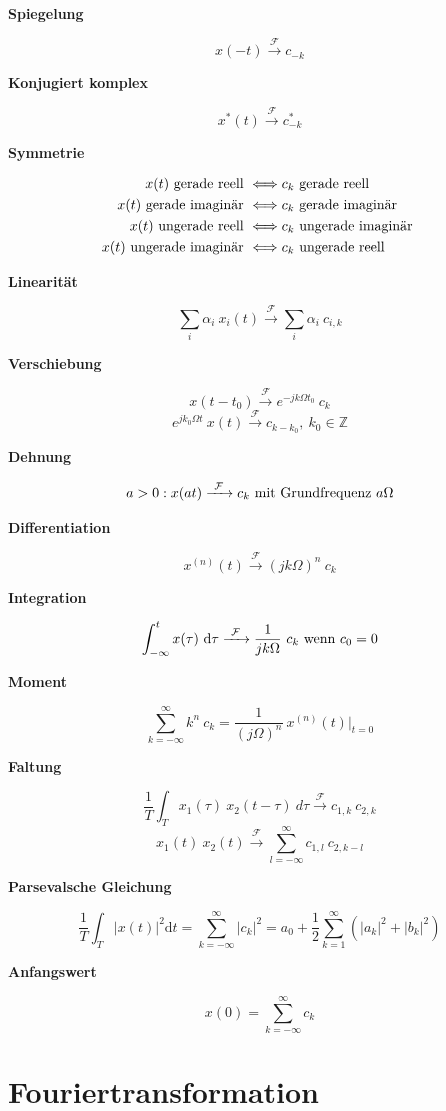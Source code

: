 \documentclass[10pt,a4paper]{article}
\newcommand{\fancyformula}[2]{
	\small
	\raggedright\sffamily\textbf{#1}
	#2
}
\newcommand{\ftransform}{
	\xrightarrow{~\mathcal{F}~}
}
\begin{document}
\begin{multicols}{2}
\fancyformula{Spiegelung}{
	\[ x(-t)  \ftransform c_{-k} \]
}

\fancyformula{Konjugiert komplex}{
	\[ x^*(t)  \ftransform c^*_{-k} \]
}

\fancyformula{Symmetrie}{
 \begin{align*}
	x(t) \textnormal{ gerade reell } &\Longleftrightarrow c_k \textnormal{ gerade reell } \\
	x(t) \textnormal{ gerade imaginär } &\Longleftrightarrow c_k \textnormal{ gerade imaginär } \\
	x(t) \textnormal{ ungerade reell } &\Longleftrightarrow c_k \textnormal{ ungerade imaginär } \\
	x(t) \textnormal{ ungerade imaginär } &\Longleftrightarrow c_k \textnormal{ ungerade reell }
\end{align*}
}

\fancyformula{Linearität}{
	\[ \sum_i \alpha_i ~ x_i(t) \ftransform \sum_i \alpha_i ~ c_{i, k} \]
}

\fancyformula{Verschiebung}{
	\[ x(t - t_0) \ftransform e^{-jk\Omega t_0} ~ c_k \]
	\[ e^{jk_0\Omega t} ~ x(t) \ftransform c_{k-k_0}, ~ k_0 \in \mathbb Z \]
}

\fancyformula{Dehnung}{
	\[ a > 0: x(at) \ftransform c_k \textnormal{ mit Grundfrequenz } a\Omega \]
}

\fancyformula{Differentiation}{
	\[ x^{(n)}(t) \ftransform (jk\Omega)^n ~ c_k \]
}

\fancyformula{Integration}{
	\[ \int_{-\infty}^t x(\tau) ~ \mathrm d\tau \ftransform \frac{1}{jk\Omega} ~ c_k \textnormal{ wenn } c_0 = 0 \]
}

\fancyformula{Moment}{
	\[ \sum_{k=-\infty}^\infty k^n ~ c_k = \frac{1}{(j\Omega)^n} ~ x^{(n)}(t) \bigg|_{t=0} \]
}

\fancyformula{Faltung}{
	\[ \frac{1}{T} \int_T x_1(\tau) ~ x_2(t - \tau) \mathrm ~ d\tau \ftransform c_{1,k} ~ c_{2, k} \]
	\[ x_1(t) ~ x_2(t) \ftransform \sum_{l=-\infty}^{\infty} c_{1, l} ~ c_{2, k - l} \]
}

\fancyformula{Parsevalsche Gleichung}{
	\[ \frac{1}{T} \int_T |x(t)|^2 \mathrm dt = \sum_{k = -\infty}^{\infty} |c_k|^2 = a_0 + \frac{1}{2} \sum_{k=1}^{\infty} \left(|a_k|^2 + |b_k|^2 \right) \]
}
\fancyformula{Anfangswert}{
	\[ x(0) = \sum_{k=-\infty}^{\infty} c_k \]
}
\end{multicols}

\newpage

\section*{Fouriertransformation}
\end{document}
